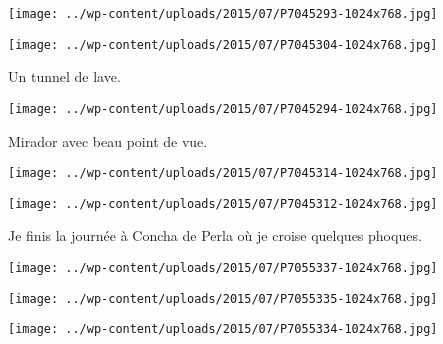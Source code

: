  

 

\begin{center} \texttt{[image: ../wp-content/uploads/2015/07/P7045293-1024x768.jpg]} \end{center}

 

 

\begin{center} \texttt{[image: ../wp-content/uploads/2015/07/P7045304-1024x768.jpg]} \end{center}

 

 Un tunnel de lave. 

 

\begin{center} \texttt{[image: ../wp-content/uploads/2015/07/P7045294-1024x768.jpg]} \end{center}

 

 Mirador avec beau point de vue. 

 

\begin{center} \texttt{[image: ../wp-content/uploads/2015/07/P7045314-1024x768.jpg]} \end{center}

 

 

\begin{center} \texttt{[image: ../wp-content/uploads/2015/07/P7045312-1024x768.jpg]} \end{center}

 

 Je finis la journée à Concha de Perla où je croise quelques phoques. 

 

\begin{center} \texttt{[image: ../wp-content/uploads/2015/07/P7055337-1024x768.jpg]} \end{center}

 

 

\begin{center} \texttt{[image: ../wp-content/uploads/2015/07/P7055335-1024x768.jpg]} \end{center}

 

 

\begin{center} \texttt{[image: ../wp-content/uploads/2015/07/P7055334-1024x768.jpg]} \end{center}

